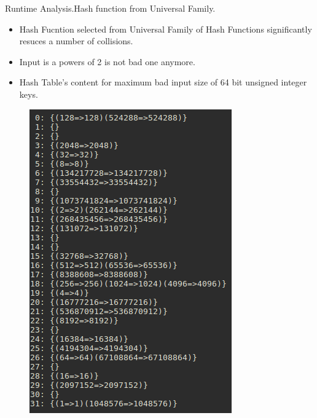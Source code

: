 \documentclass{beamer}
\begin{document}
\begin{frame}{Runtime Analysis.}{Hash function from Universal Family.}
  \begin{itemize}
  \item Hash Fucntion selected from Universal Family of Hash Functions significantly resuces a number of collisions.
  \item Input is a powers of 2 is not bad one anymore.
  \item Hash Table's content for maximum bad input size of 64 bit unsigned integer keys. 
  \end{itemize}
  \begin{figure}
    \includegraphics[scale=0.3]{uint64_t_universal}
  \end{figure}
\end{frame}
\end{document}
